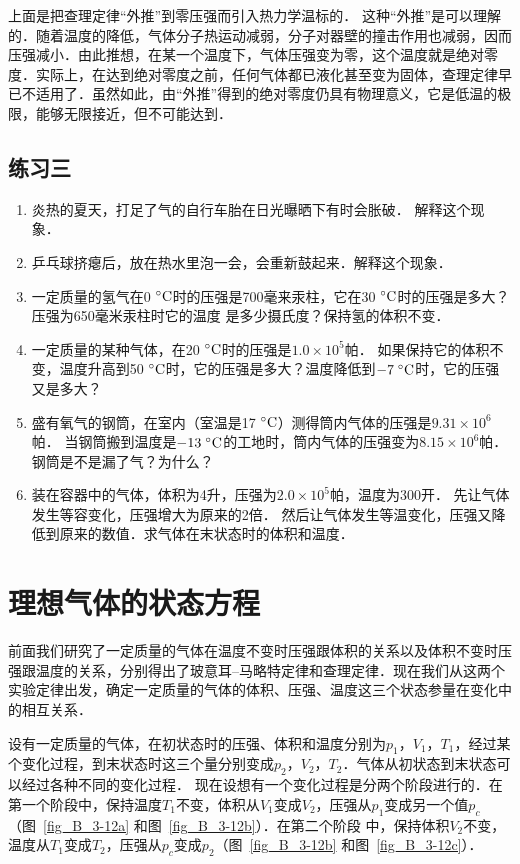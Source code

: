 上面是把查理定律“外推”到零压强而引入热力学温标的．
这种“外推”是可以理解的．随着温度的降低，气体分子热运动减弱，分子对器壁的撞击作用也减弱，因而压强减小．由此推想，在某一个温度下，气体压强变为零，这个温度就是绝对零度．实际上，在达到绝对零度之前，任何气体都已液化甚至变为固体，查理定律早已不适用了．虽然如此，由“外推”得到的绝对零度仍具有物理意义，它是低温的极限，能够无限接近，但不可能达到．

\subsection*{练习三}

\begin{enumerate}
    \item 炎热的夏天，打足了气的自行车胎在日光曝晒下有时会胀破．
    解释这个现象．
\item 乒乓球挤瘪后，放在热水里泡一会，会重新鼓起来．解释这个现象．
\item 一定质量的氢气在0$\;{}^\circ\text{C}$时的压强是700毫来汞柱，它在30$\;{}^\circ\text{C}$时的压强是多大？压强为650毫米汞柱时它的温度
是多少摄氏度？保持氢的体积不变．
\item 一定质量的某种气体，在20$\;{}^\circ\text{C}$时的压强是$1.0\times 10^5$帕．
如果保持它的体积不变，温度升高到50$\;{}^\circ\text{C}$时，它的压强是多大？温度降低到$-7 \;{}^\circ\text{C} $时，它的压强又是多大？
\item 盛有氧气的钢筒，在室内（室温是17$\;{}^\circ\text{C}$）测得筒内气体的压强是$9.31\times 10^6$帕．
当钢筒搬到温度是$-13 \;{}^\circ\text{C}$的工地时，筒内气体的压强变为$8.15\times 10^6$帕．钢筒是不是漏了气？为什么？
\item 装在容器中的气体，体积为4升，压强为$2.0\times 10^5$帕，温度为300开．
先让气体发生等容变化，压强增大为原来的2倍．
然后让气体发生等温变化，压强又降低到原来的数值．求气体在末状态时的体积和温度．

\end{enumerate}

\section{理想气体的状态方程}
前面我们研究了一定质量的气体在温度不变时压强跟体积的关系以及体积不变时压强跟温度的关系，分别得出了玻意耳--马略特定律和查理定律．现在我们从这两个实验定律出发，确定一定质量的气体的体积、压强、温度这三个状态参量在变化中的相互关系．

设有一定质量的气体，在初状态时的压强、体积和温度分别为$p_1 $，$ V_1 $，$ T_1$，经过某个变化过程，到末状态时这三个量分别变成$p_2 $，$ V_2 $，$ T_2$．气体从初状态到末状态可以经过各种不同的变化过程．
现在设想有一个变化过程是分两个阶段进行的．在第一个阶段中，保持温度$T_1$不变，体积从$V_1$变成$V_2$，压强从$p_1$变成另一个值$p_c$（图~\ref{fig_B_3-12a} 和图~\ref{fig_B_3-12b}）．在第二个阶段
中，保持体积$V_2$不变，温度从$T_1$变成$T_2$，压强从$p_c$变成$p_2$（图~\ref{fig_B_3-12b} 和图~\ref{fig_B_3-12c}）．


